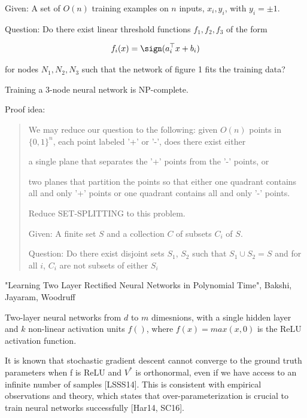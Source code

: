 \documentclass[english]{article}
\begin{document}
Given: A set of $O(n)$ training examples on $n$ inputs, $x_i,y_i$, with $y_i  = \pm 1$.

Question: Do there exist linear threshold functions $f_1,f_2,f_3$ of the form

$$f_i(x) = \sign(a_i^\top x + b_i)$$

for nodes $N_1, N_2, N_3$ such that the network of figure 1 fits the training data?


\begin{theorem} Training a 3-node neural network is NP-complete.
\end{theorem}
Proof idea: 

\begin{quote}
We may reduce our question to the following: given $O(n)$ points in $\{0, 1\}^n$,
each point labeled '+' or '-', does there exist either
\benum

\item a single plane that separates the '+' points from the '-' points, or

\item two planes that partition the points so that either one quadrant contains all and only '+' points or one quadrant contains all and only '-' points.


\eenum

Reduce SET-SPLITTING to this problem.

Given: A finite set $S$ and a collection $C$ of subsets $C_i$ of $S$.

Question: Do there exist disjoint sets $S_1$, $S_2$ such that $S_1 \cup S_2 = S$ and for all $i$, $C_i$ are not subsets of either $S_i$

\end{quote}


\item "Learning Two Layer Rectified Neural Networks in Polynomial Time", Bakshi, Jayaram, Woodruff 

Two-layer neural networks from $d$ to $m$ dimesnions, with a single  hidden layer and $k$ non-linear activation units $f()$, where $f(x) = max(x,0)$ is the ReLU activation function.

It is known that stochastic gradient descent cannot converge to the ground truth parameters when f is ReLU and $V^*$ is orthonormal, even if we have access to an infinite number of samples [LSSS14]. This is consistent with empirical observations and theory, which states that
over-parameterization is crucial to train neural networks successfully [Har14, SC16].
\end{document}
